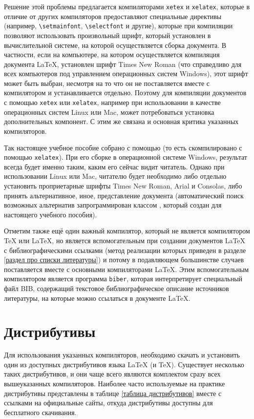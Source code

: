 \documentclass[workbook, draught]{fefudoc}
\begin{document}
Решение этой проблемы предлагается компиляторами \texttt{xetex} и \texttt{xelatex}, которые в отличие от других компиляторов предоставляют специальные директивы (например, \verb+\setmainfont+, \verb+\selectfont+ и другие), которые при компиляции позволяют использовать произвольный шрифт, который установлен в вычислительной системе, на которой осуществляется сборка документа.
В частности, если на компьютере, на котором осуществляется компиляция документа \LaTeX{}, установлен шрифт Times New Roman (что справедливо для всех компьютеров под управлением операционных систем Windows), этот шрифт может быть выбран, несмотря на то что он не поставляется вместе с компилятором и устанавливается отдельно.
Поэтому для компиляции документов с помощью \texttt{xetex} или \texttt{xelatex}, например при использовании в качестве операционных систем Linux или Mac, может потребоваться установка дополнительных компонент.
С этим же связана и основная критика указанных компиляторов.

Так настоящее учебное пособие собрано с помощью \XeLaTeX{} (то есть скомпилировано с помощью \texttt{xelatex}).
При его сборке в операционной системе Windows, результат всегда будет именно таким, каким его сейчас видит читатель.
Однако при использовании Linux или Mac, читателю будет необходимо либо отдельно установить проприетарные шрифты Times New Roman, Arial и Consolas, либо принять альтернативное, иное, представление документа (автоматический поиск возможных альтернатив запрограммирован классом \XeLaTeX{}, который создан для настоящего учебного пособия).

Отметим также ещё один важный компилятор, который не является компилятором \TeX{} или \LaTeX{}, но является вспомогательным при создании документов \LaTeX{} с библиографическими ссылками (метод реализации которых приведен в разделе \ref{раздел про списки литературы}) и потому в подавляющем большинстве случаев поставляется вместе с основными компиляторами \LaTeX{}.
Этим вспомогательным компилятором является программа \texttt{biber}, которая интерпретирует специальный файл BIB, содержащий текстовое библиографическое описание источников литературы, на которые можно ссылаться в документе \LaTeX{}.

\section{Дистрибутивы}\label{раздел про дистрибутивы}
Для использования указанных компиляторов, необходимо скачать и установить один из доступных дистрибутивов языка \LaTeX{} (и \TeX{}).
Существует несколько таких дистрибутивов, и они чаще всего являются комплектом сразу всех вышеуказанных компиляторов.
Наиболее часто используемые на практике дистрибутивы представлены в таблице \ref{таблица дистрибутивов} вместе с ссылками на официальные сайты, откуда дистрибутивы доступны для бесплатного скачивания.
\end{document}
